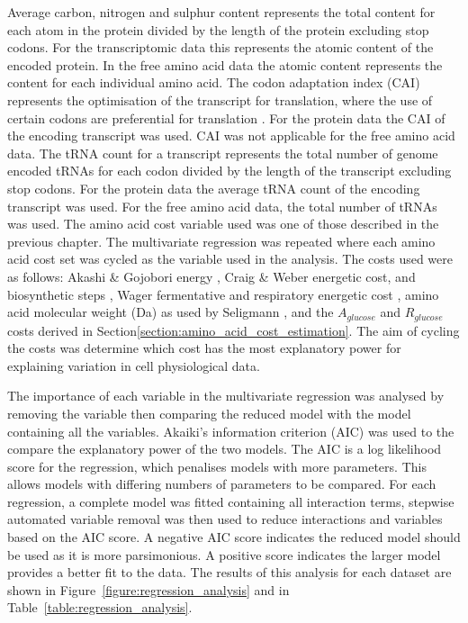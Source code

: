 Average carbon, nitrogen and sulphur content represents the total content for each atom in the protein divided by the length of the protein excluding stop codons. For the transcriptomic data this represents the atomic content of the encoded protein. In the free amino acid data the atomic content represents the content for each individual amino acid. The codon adaptation index (CAI) represents the optimisation of the transcript for translation, where the use of certain codons are preferential for translation \cite{ikemura1982}. For the protein data the CAI of the encoding transcript was used. CAI was not applicable for the free amino acid data. The tRNA count for a transcript represents the total number of genome encoded tRNAs for each codon divided by the length of the transcript excluding stop codons. For the protein data the average tRNA count of the encoding transcript was used. For the free amino acid data, the total number of tRNAs was used. The amino acid cost variable used was one of those described in the previous chapter. The multivariate regression was repeated where each amino acid cost set was cycled as the variable used in the analysis. The costs used were as follows: Akashi \& Gojobori energy \cite{akashi2002}, Craig \& Weber energetic cost, and biosynthetic steps \cite{craig1998}, Wager fermentative and respiratory energetic cost \cite{wagner2005}, amino acid molecular weight (Da) as used by Seligmann \cite{seligmann2004}, and the $A_{glucose}$ and $R_{glucose}$ costs derived in Section\vref{section:amino_acid_cost_estimation}. The aim of cycling the costs was determine which cost has the most explanatory power for explaining variation in cell physiological data.

The importance of each variable in the multivariate regression was analysed by removing the variable then comparing the reduced model with the model containing all the variables. Akaiki's information criterion (AIC) \cite{akaike1974} was used to the compare the explanatory power of the two models. The AIC is a log likelihood score for the regression, which penalises models with more parameters. This allows models with differing numbers of parameters to be compared. For each regression, a complete model was fitted containing all interaction terms, stepwise automated variable removal was then used to reduce interactions and variables based on the AIC score. A negative AIC score indicates the reduced model should be used as it is more parsimonious. A positive score indicates the larger model provides a better fit to the data. The results of this analysis for each dataset are shown in Figure~\vref{figure:regression_analysis} and in Table~\vref{table:regression_analysis}.

